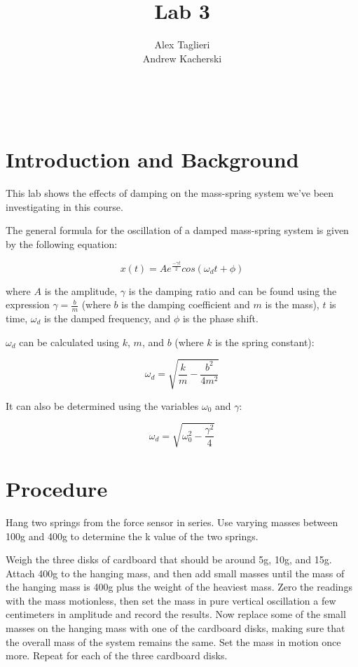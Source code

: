 \documentclass[]{article}
\title{Lab 3}
\author{
	Alex Taglieri
	\\
	Andrew Kacherski
	}
\begin{document}
\maketitle
\newpage
\
\raggedright


\section{Introduction and Background}

This lab shows the effects of damping on the mass-spring system we've been investigating in this course.

The general formula for the oscillation of a damped mass-spring system is given by the following equation:


\begin{equation}\label{uncertaintyLong}
x(t) = Ae^{\frac{-\gamma t}{2}}cos(\omega_d t + \phi)
\end{equation}

where $A$ is the amplitude, $\gamma$ is the damping ratio and can be found using the expression  $\gamma = \frac{b}{m}$ (where $b$ is the damping coefficient and $m$ is the mass), $t$ is time, $\omega_d$ is the damped frequency, and $\phi$ is the phase shift.

$\omega_d$ can be calculated using $k$, $m$, and $b$ (where $k$ is the spring constant):

\begin{equation}
	\omega_d = \sqrt{\frac{k}{m} - \frac{b^2}{4m^2}}
\end{equation}

It can also be determined using the variables $\omega_0$ and $\gamma$:

\begin{equation}
	\omega_d = \sqrt{\omega_0 ^2 - \frac{\gamma^2}{4}}
\end{equation}



\section{Procedure}

Hang two springs from the force sensor in series. Use varying masses between 100g and 400g to determine the k value of the two springs. 

Weigh the three disks of cardboard that should be around 5g, 10g, and 15g. Attach 400g to the hanging mass, and then add small masses until the mass of the hanging mass is 400g plus the weight of the heaviest mass. Zero the readings with the mass motionless, then set the mass in pure vertical oscillation a few centimeters in amplitude and record the results.
Now replace some of the small masses on the hanging mass with one of the cardboard disks, making sure that the overall mass of the system remains the same. Set the mass in motion once more. Repeat for each of the three cardboard disks.
\end{document}

